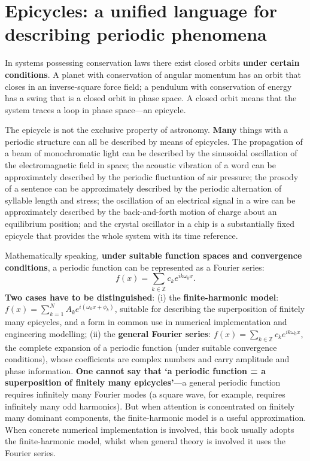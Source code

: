 \section*{Epicycles: a unified language for describing periodic phenomena}

In systems possessing conservation laws there exist closed orbits \textbf{under certain conditions}. A planet with conservation of angular momentum has an orbit that closes in an inverse-square force field; a pendulum with conservation of energy has a swing that is a closed orbit in phase space. A closed orbit means that the system traces a loop in phase space---an epicycle.

The epicycle is not the exclusive property of astronomy. \textbf{Many} things with a periodic structure can all be described by means of epicycles. The propagation of a beam of monochromatic light can be described by the sinusoidal oscillation of the electromagnetic field in space; the acoustic vibration of a word can be approximately described by the periodic fluctuation of air pressure; the prosody of a sentence can be approximately described by the periodic alternation of syllable length and stress; the oscillation of an electrical signal in a wire can be approximately described by the back-and-forth motion of charge about an equilibrium position; and the crystal oscillator in a chip is a substantially fixed epicycle that provides the whole system with its time reference.

Mathematically speaking, \textbf{under suitable function spaces and convergence conditions}, a periodic function can be represented as a Fourier series:
\[
f(x) = \sum_{k \in \mathbb{Z}} c_k e^{i k \omega_0 x}.
\]
\textbf{Two cases have to be distinguished}: (i) the \textbf{finite-harmonic model}: $f(x) = \sum_{k=1}^{N} A_k e^{i(\omega_k x + \phi_k)}$, suitable for describing the superposition of finitely many epicycles, and a form in common use in numerical implementation and engineering modelling; (ii) the \textbf{general Fourier series}: $f(x) = \sum_{k \in \mathbb{Z}} c_k e^{i k \omega_0 x}$, the complete expansion of a periodic function (under suitable convergence conditions), whose coefficients are complex numbers and carry amplitude and phase information. \textbf{One cannot say that `a periodic function = a superposition of finitely many epicycles'}---a general periodic function requires infinitely many Fourier modes (a square wave, for example, requires infinitely many odd harmonics). But when attention is concentrated on finitely many dominant components, the finite-harmonic model is a useful approximation. When concrete numerical implementation is involved, this book usually adopts the finite-harmonic model, whilst when general theory is involved it uses the Fourier series.

